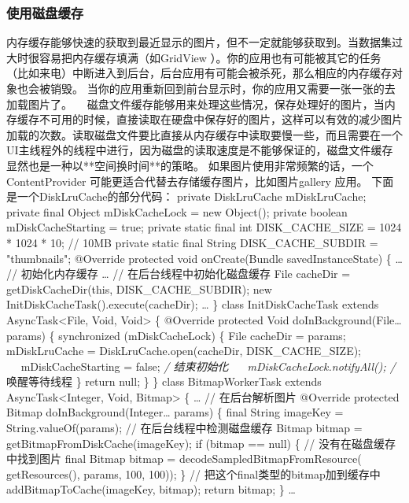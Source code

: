 \documentclass[9pt, b5paper]{article}
\begin{document}
\subsubsection{使用磁盘缓存}
\label{sec-8-2-2}
内存缓存能够快速的获取到最近显示的图片，但不一定就能够获取到。当数据集过大时很容易把内存缓存填满（如GridView ）。你的应用也有可能被其它的任务（比如来电）中断进入到后台，后台应用有可能会被杀死，那么相应的内存缓存对象也会被销毁。 当你的应用重新回到前台显示时，你的应用又需要一张一张的去加载图片了。
   　磁盘文件缓存能够用来处理这些情况，保存处理好的图片，当内存缓存不可用的时候，直接读取在硬盘中保存好的图片，这样可以有效的减少图片加载的次数。读取磁盘文件要比直接从内存缓存中读取要慢一些，而且需要在一个UI主线程外的线程中进行，因为磁盘的读取速度是不能够保证的，磁盘文件缓存显然也是一种以**空间换时间**的策略。
如果图片使用非常频繁的话，一个 ContentProvider 可能更适合代替去存储缓存图片，比如图片gallery 应用。
下面是一个DiskLruCache的部分代码：
private DiskLruCache mDiskLruCache;
private final Object mDiskCacheLock = new Object();
private boolean mDiskCacheStarting = true;
private static final int DISK\_CACHE\_SIZE = 1024 * 1024 * 10; // 10MB
private static final String DISK\_CACHE\_SUBDIR = "thumbnails";
@Override
protected void onCreate(Bundle savedInstanceState) \{
    \ldots{}
    // 初始化内存缓存
    \ldots{}
    // 在后台线程中初始化磁盘缓存
    File cacheDir = getDiskCacheDir(this, DISK\_CACHE\_SUBDIR);
    new InitDiskCacheTask().execute(cacheDir);
    \ldots{}
\}
class InitDiskCacheTask extends AsyncTask<File, Void, Void> \{
    @Override
    protected Void doInBackground(File\ldots{} params) \{
        synchronized (mDiskCacheLock) \{
            File cacheDir = params\footnotemark[2]{};
  mDiskLruCache = DiskLruCache.open(cacheDir, DISK\_CACHE\_SIZE);
　 mDiskCacheStarting = false; \emph{/ 结束初始化
　 mDiskCacheLock.notifyAll(); /} 唤醒等待线程
        \}
        return null;
    \}
\}
class BitmapWorkerTask extends AsyncTask<Integer, Void, Bitmap> \{
    \ldots{}
    // 在后台解析图片
    @Override
    protected Bitmap doInBackground(Integer\ldots{} params) \{
        final String imageKey = String.valueOf(params\footnotemark[2]{});
        // 在后台线程中检测磁盘缓存
        Bitmap bitmap = getBitmapFromDiskCache(imageKey);
        if (bitmap == null) \{ // 没有在磁盘缓存中找到图片
 final Bitmap bitmap = decodeSampledBitmapFromResource(
                    getResources(), params\footnotemark[2]{}, 100, 100));
        \}
        // 把这个final类型的bitmap加到缓存中
        addBitmapToCache(imageKey, bitmap);
        return bitmap;
    \}
    \ldots{}
\end{document}
